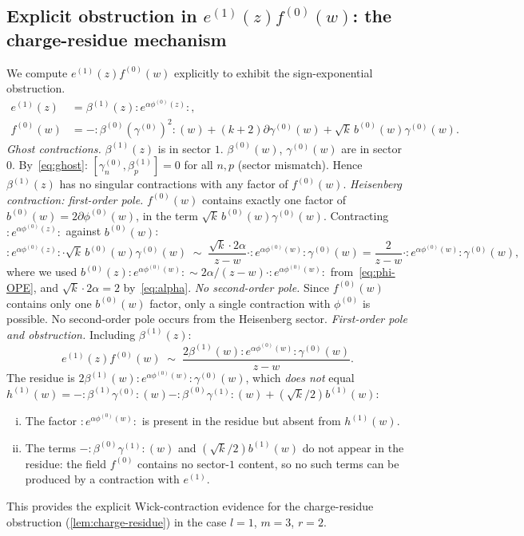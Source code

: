 \documentclass[12pt]{article}
\theoremstyle{plain}
\theoremstyle{definition}
\theoremstyle{remark}
\newcommand{\bl}[1]{\beta^{(#1)}}
\newcommand{\gl}[1]{\gamma^{(#1)}}
\newcommand{\el}[1]{e^{(#1)}}
\newcommand{\hl}[1]{h^{(#1)}}
\newcommand{\fl}[1]{f^{(#1)}}
\newcommand{\OPE}{\sim}
\newcommand{\no}[1]{:\!#1\!:}
\begin{document}
\subsection{Explicit obstruction in \texorpdfstring{$e^{(1)}(z)f^{(0)}(w)$}{e1f0}: the charge-residue mechanism}
We compute $\el{1}(z)\fl{0}(w)$ explicitly to exhibit the sign-exponential obstruction.
\begin{align*}
  \el{1}(z)&=\bl{1}(z)\no{e^{\alpha\phi^{(0)}(z)}},\\
  \fl{0}(w)&=-\no{\bl{0}(\gl{0})^2}(w)+(k+2)\partial\gl{0}(w)+\sqrt{k}\,b^{(0)}(w)\gl{0}(w).
\end{align*}
\emph{Ghost contractions.}
$\bl{1}(z)$ is in sector $1$.
$\bl{0}(w)$, $\gl{0}(w)$ are in sector $0$.
By~\eqref{eq:ghost}: $[\gl{0}_n,\bl{1}_p]=0$ for all $n,p$ (sector mismatch).
Hence $\bl{1}(z)$ has no singular contractions with any factor of $\fl{0}(w)$.
\emph{Heisenberg contraction: first-order pole.}
$\fl{0}(w)$ contains exactly one factor of $b^{(0)}(w)=2\partial\phi^{(0)}(w)$,
in the term $\sqrt{k}\,b^{(0)}(w)\gl{0}(w)$.
Contracting $\no{e^{\alpha\phi^{(0)}(z)}}$ against $b^{(0)}(w)$:
\[
  \no{e^{\alpha\phi^{(0)}(z)}}\cdot\sqrt{k}\,b^{(0)}(w)\gl{0}(w)
  \;\OPE\; \frac{\sqrt{k}\cdot 2\alpha}{z-w}\cdot\no{e^{\alpha\phi^{(0)}(w)}}\gl{0}(w)
  = \frac{2}{z-w}\cdot\no{e^{\alpha\phi^{(0)}(w)}}\gl{0}(w),
\]
where we used $b^{(0)}(z)\no{e^{\alpha\phi^{(0)}(w)}}\OPE 2\alpha/(z-w)\cdot\no{e^{\alpha\phi^{(0)}(w)}}$
from~\eqref{eq:phi-OPE}, and $\sqrt{k}\cdot 2\alpha=2$ by~\eqref{eq:alpha}.
\emph{No second-order pole.}
Since $\fl{0}(w)$ contains only one $b^{(0)}(w)$ factor,
only a single contraction with $\phi^{(0)}$ is possible.
No second-order pole occurs from the Heisenberg sector.
\emph{First-order pole and obstruction.}
Including $\bl{1}(z)$:
\[
  \el{1}(z)\fl{0}(w)\;\OPE\;\frac{2\bl{1}(w)\no{e^{\alpha\phi^{(0)}(w)}}\gl{0}(w)}{z-w}.
\]
The residue is $2\bl{1}(w)\no{e^{\alpha\phi^{(0)}(w)}}\gl{0}(w)$, which \emph{does not}
equal $\hl{1}(w)=-\no{\bl{1}\gl{0}}(w)-\no{\bl{0}\gl{1}}(w)+(\sqrt{k}/2)b^{(1)}(w)$:
\begin{enumerate}[(i)]
  \item The factor $\no{e^{\alpha\phi^{(0)}(w)}}$ is present in the residue but absent
    from $\hl{1}(w)$.
  \item The terms $-\no{\bl{0}\gl{1}}(w)$ and $(\sqrt{k}/2)b^{(1)}(w)$ do not appear
    in the residue: the field $\fl{0}$ contains no sector-$1$ content, so no
    such terms can be produced by a contraction with $\el{1}$.
\end{enumerate}
This provides the explicit Wick-contraction evidence for the charge-residue
obstruction (\cref{lem:charge-residue}) in the case $l=1$, $m=3$, $r=2$.
\end{document}
